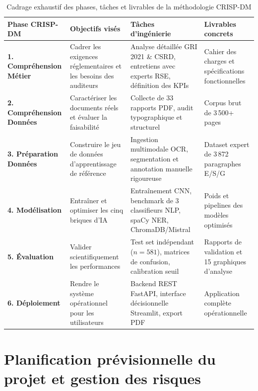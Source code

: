 \documentclass[12pt,a4paper]{report}
\begin{document}
\begin{table}[H]
    \centering
    \begin{tabular}{|p{3.2cm}|p{3.8cm}|p{4.5cm}|p{3.3cm}|}
        \hline
        \textbf{Phase CRISP-DM} & \textbf{Objectifs visés} & \textbf{Tâches d'ingénierie} & \textbf{Livrables concrets} \\
        \hline
        \textbf{1. Compréhension Métier} & Cadrer les exigences réglementaires et les besoins des auditeurs & Analyse détaillée GRI 2021 \& CSRD, entretiens avec experts RSE, définition des KPIs & Cahier des charges et spécifications fonctionnelles \\
        \hline
        \textbf{2. Compréhension Données} & Caractériser les documents réels et évaluer la faisabilité & Collecte de 33 rapports PDF, audit typographique et structurel & Corpus brut de 3\,500+ pages \\
        \hline
        \textbf{3. Préparation Données} & Construire le jeu de données d'apprentissage de référence & Ingestion multimodale OCR, segmentation et annotation manuelle rigoureuse & Dataset expert de 3\,872 paragraphes E/S/G \\
        \hline
        \textbf{4. Modélisation} & Entraîner et optimiser les cinq briques d'IA & Entraînement CNN, benchmark de 3 classifieurs NLP, spaCy NER, ChromaDB/Mistral & Poids et pipelines des modèles optimisés \\
        \hline
        \textbf{5. Évaluation} & Valider scientifiquement les performances & Test set indépendant ($n=581$), matrices de confusion, calibration seuil & Rapports de validation et 15 graphiques d'analyse \\
        \hline
        \textbf{6. Déploiement} & Rendre le système opérationnel pour les utilisateurs & Backend REST FastAPI, interface décisionnelle Streamlit, export PDF & Application complète opérationnelle \\
        \hline
    \end{tabular}
    \caption{Cadrage exhaustif des phases, tâches et livrables de la méthodologie CRISP-DM}
    \label{tab:cadrage_crisp}
\end{table}

\section{Planification prévisionnelle du projet et gestion des risques}
\end{document}
